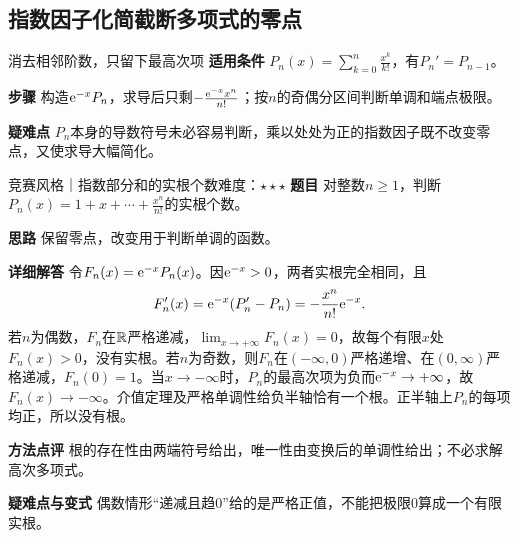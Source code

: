 \subsection{指数因子化简截断多项式的零点}
\begin{method}{消去相邻阶数，只留下最高次项}
\textbf{适用条件} $P_n(x)=\sum_{k=0}^n\frac{x^k}{k!}$，有$P_n'=P_{n-1}$。\par
\textbf{步骤} 构造$\mathrm{e}^{-x}P_n$，求导后只剩$-\frac{\mathrm{e}^{-x}x^n}{n!}$；按$n$的奇偶分区间判断单调和端点极限。\par
\textbf{疑难点} $P_n$本身的导数符号未必容易判断，乘以处处为正的指数因子既不改变零点，又使求导大幅简化。
\end{method}
\begin{example}{竞赛风格｜指数部分和的实根个数}{难度：$\star\star\star$}\label{cd:ex:exp-polynomial}
\textbf{题目} 对整数$n\ge1$，判断$P_n(x)=1+x+\cdots+\frac{x^n}{n!}$的实根个数。\par
\textbf{思路} 保留零点，改变用于判断单调的函数。\par
\textbf{详细解答} 令$F_n(x)=\mathrm{e}^{-x}P_n(x)$。因$\mathrm{e}^{-x}>0$，两者实根完全相同，且
\[
 F_n'(x)=\mathrm{e}^{-x}(P_n'-P_n)
 =-\dfrac{x^n}{n!}\mathrm{e}^{-x}.
\]
若$n$为偶数，$F_n$在$\mathbb{R}$严格递减，$\lim_{x\to+\infty}F_n(x)=0$，故每个有限$x$处$F_n(x)>0$，没有实根。若$n$为奇数，则$F_n$在$(-\infty,0)$严格递增、在$(0,\infty)$严格递减，$F_n(0)=1$。当$x\to-\infty$时，$P_n$的最高次项为负而$\mathrm{e}^{-x}\to+\infty$，故$F_n(x)\to-\infty$。介值定理及严格单调性给负半轴恰有一个根。正半轴上$P_n$的每项均正，所以没有根。\par
\textbf{方法点评} 根的存在性由两端符号给出，唯一性由变换后的单调性给出；不必求解高次多项式。\par
\textbf{疑难点与变式} 偶数情形“递减且趋0”给的是严格正值，不能把极限0算成一个有限实根。
\end{example}

